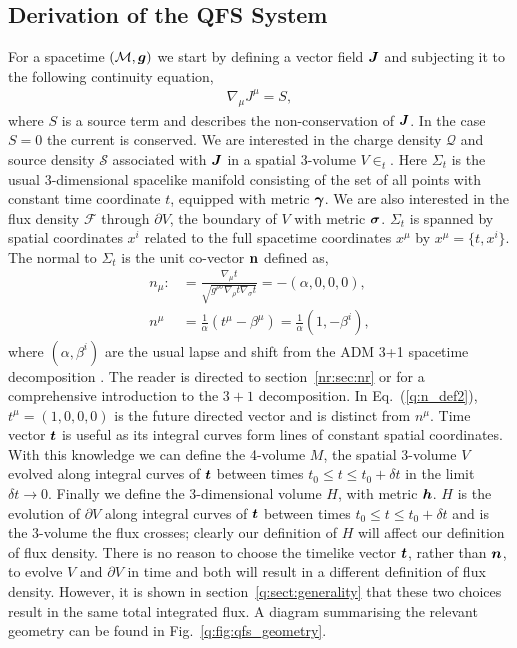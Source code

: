 \subsection{Derivation of the QFS System} \label{q:sect:derive}
For a spacetime $(\mathcal{M},\boldsymbol{g})$ we start by defining a vector field $\boldsymbol{J}$ and subjecting it to the following continuity equation,
\begin{align}
\label{q:continuity_eqn_def}\nabla_\mu J^\mu = S,
\end{align}
where $S$ is a source term and describes the non-conservation of $\boldsymbol{J}$. In the case $S=0$ the current is conserved. We are interested in the charge density $\mathcal{Q}$ and source density $\mathcal{S}$ associated with $\boldsymbol{J}$ in a spatial 3-volume $V\in_t$. Here $\Sigma_t$ is the usual 3-dimensional spacelike manifold consisting of the set of all points with constant time coordinate $t$, equipped with metric $\boldsymbol{\gamma}$. We are also interested in the flux density $\mathcal{F}$ through $\partial V$, the boundary of $V$ with metric $\boldsymbol{\sigma}$. $\Sigma_t$ is spanned by spatial coordinates $x^i$ related to the full spacetime coordinates $x^\mu$ by $ x^\mu = \{t,x^i \}$. The normal to $\Sigma_t$ is the unit co-vector $\bf{n}$ defined as,
\begin{align}
\label{q:n_def}
n_\mu :&= \frac{\nabla_\mu t}{\sqrt{g^{\rho\sigma}\nabla_\rho t \nabla_\sigma t}} = -(\alpha,0,0,0), \\
\label{q:n_def2} n^\mu &= \frac{1}{\alpha}\left(t^\mu - \beta^\mu \right)= \frac{1}{\alpha} (1, -\beta^i ) ,
\end{align}
where $(\alpha,\beta^i)$ are the usual lapse and shift from the ADM 3+1 spacetime decomposition \cite{2008}. The reader is directed to section~\ref{nr:sec:nr} or \cite{gourgoulhon20073+} for a comprehensive introduction to the $3+1$ decomposition. In Eq.~(\ref{q:n_def2}), $t^\mu = (1,0,0,0)$ is the future directed vector and is distinct from $n^\mu$. Time vector $\boldsymbol{t}$ is useful as its integral curves form lines of constant spatial coordinates. With this knowledge we can define the 4-volume $M$, the spatial 3-volume $V$ evolved along integral curves of $\boldsymbol{t}$ between times $t_0\leq t\leq t_0 + \delta t$ in the limit $\delta t\rightarrow 0$. Finally we define the 3-dimensional volume $H$, with metric $\boldsymbol h$. $H$ is the evolution of $\partial V$ along integral curves of $\boldsymbol{t}$ between times $t_0\leq t \leq t_0 + \delta t$ and is the 3-volume the flux crosses; clearly our definition of $H$ will affect our definition of flux density. There is no reason to choose the timelike vector $\boldsymbol{t}$, rather than $\boldsymbol{n}$, to evolve $V$ and $\partial V$ in time and both will result in a different definition of flux density. However, it is shown in section~\ref{q:sect:generality} that these two choices result in the same total integrated flux. A diagram summarising the relevant geometry can be found in Fig.~\ref{q:fig:qfs_geometry}.

